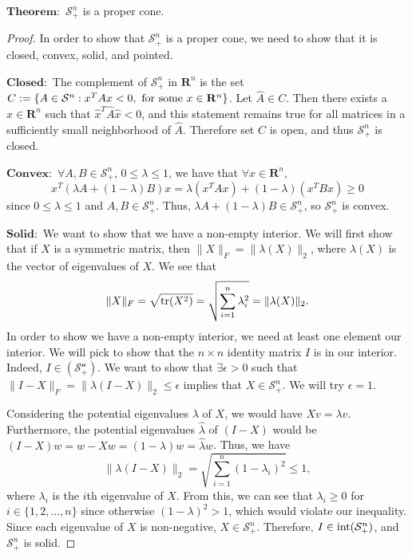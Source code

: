 	 $\mathbf{Theorem:}$ $\mathcal{S}^n_+$ is a proper cone. 
	 
	\begin{proof}
		In order to show that $\mathcal{S}^n_+$ is a proper cone, we need to show that it is closed, convex, solid, and pointed.
		 
		$\mathbf{Closed: }$ The complement of $\mathcal{S}^n_+$ in $\mathbf{R}^n$ is the set $C:= \{A \in \mathcal{S}^n : x^T A x < 0, \textnormal{ for some } x \in \mathbf{R}^n \}$. Let $\hat{A} \in C$. Then there exists a $\hat{x} \in \mathbf{R}^n$ such that $\hat{x}^T \hat{A} \hat{x} < 0$, and this statement remains true for all matrices in a sufficiently small neighborhood of $\hat{A}$. Therefore set $C$ is open, and thus $\mathcal{S}^n_+$ is closed.
		
		$\mathbf{Convex: }$ $\forall A, B \in \mathcal{S}^n_+$, $0 \leq \lambda \leq 1$, we have that $\forall x \in \mathbf{R}^n$, 
		$$
			x^T (\lambda A + (1- \lambda) B) x = \lambda (x^T A x) + (1 - \lambda) (x^T B x) \geq 0
		$$
		since $0 \leq \lambda \leq 1$ and $A, B \in \mathcal{S}^n_+$. Thus, $\lambda A + (1- \lambda) B \in \mathcal{S}^n_+$, so $\mathcal{S}^n_+$ is convex. 
	
		$\mathbf{Solid: }$ We want to show that we have a non-empty interior. We will first show that if $X$ is a symmetric matrix, then $\|X\|_F = \|\lambda(X)\|_2$, where $\lambda(X)$ is the vector of eigenvalues of $X$. We see that
		$$
		\|X\|_F = \sqrt{\textnormal{tr}(X^2)} = \sqrt{\sum_{i=1}^{n} \lambda_i^2} = \|\lambda(X)\|_2.
		$$
		In order to show we have a non-empty interior, we need at least one element our interior. We will pick to show that the $n \times n$ identity matrix $I$ is in our interior. Indeed, $I \in \mathcal{(S_+^n)}$. We want to show that $\exists \epsilon > 0$ such that $\|I - X\|_F = \|\lambda(I - X)\|_2 \leq \epsilon$ implies that $X \in \mathcal{S}_+^n$. We will try $\epsilon = 1$. 
		
		Considering the potential eigenvalues $\lambda$ of $X$, we would have $Xv = \lambda v$. Furthermore, the potential eigenvalues $\hat{\lambda}$ of $(I-X)$ would be $(I - X)w = w - Xw = (1 - \lambda)w = \hat{\lambda} w$. Thus, we have
		$$
		\|\lambda(I - X)\|_2 = \sqrt{\sum_{i=1}^{n} (1- \lambda_i)^2} \leq 1,
		$$
		where $\lambda_i$ is the $i$th eigenvalue of $X$. From this, we can see that $\lambda_i \geq 0$ for $i \in \{1, 2, \dots, n\}$ since otherwise $(1 - \lambda)^2 > 1$, which would violate our inequality. Since each eigenvalue of $X$ is non-negative, $X \in \mathcal{S}_+^n$. Therefore, $I \in \textnormal{int}(\mathcal{S}_+^n)$, and $\mathcal{S}_+^n$ is solid. 
		

\end{proof}
